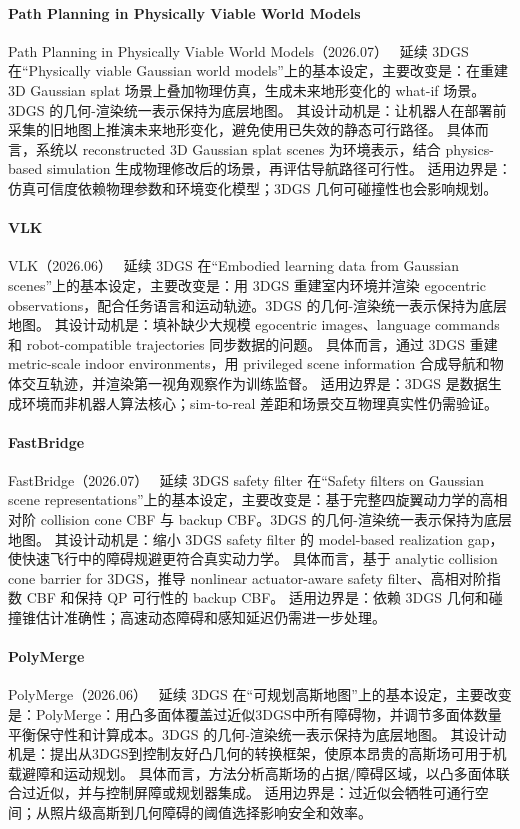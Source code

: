 \paragraph{Path Planning in Physically Viable World Models}
Path Planning in Physically Viable World Models（2026.07）~\cite{2607_00673} 延续 3DGS 在“Physically viable Gaussian world models”上的基本设定，主要改变是：在重建 3D Gaussian splat 场景上叠加物理仿真，生成未来地形变化的 what-if 场景。3DGS 的几何-渲染统一表示保持为底层地图。
其设计动机是：让机器人在部署前采集的旧地图上推演未来地形变化，避免使用已失效的静态可行路径。
具体而言，系统以 reconstructed 3D Gaussian splat scenes 为环境表示，结合 physics-based simulation 生成物理修改后的场景，再评估导航路径可行性。
适用边界是：仿真可信度依赖物理参数和环境变化模型；3DGS 几何可碰撞性也会影响规划。

\paragraph{VLK}
VLK（2026.06）~\cite{2606_30645} 延续 3DGS 在“Embodied learning data from Gaussian scenes”上的基本设定，主要改变是：用 3DGS 重建室内环境并渲染 egocentric observations，配合任务语言和运动轨迹。3DGS 的几何-渲染统一表示保持为底层地图。
其设计动机是：填补缺少大规模 egocentric images、language commands 和 robot-compatible trajectories 同步数据的问题。
具体而言，通过 3DGS 重建 metric-scale indoor environments，用 privileged scene information 合成导航和物体交互轨迹，并渲染第一视角观察作为训练监督。
适用边界是：3DGS 是数据生成环境而非机器人算法核心；sim-to-real 差距和场景交互物理真实性仍需验证。

\paragraph{FastBridge}
FastBridge（2026.07）~\cite{2607_01200} 延续 3DGS safety filter 在“Safety filters on Gaussian scene representations”上的基本设定，主要改变是：基于完整四旋翼动力学的高相对阶 collision cone CBF 与 backup CBF。3DGS 的几何-渲染统一表示保持为底层地图。
其设计动机是：缩小 3DGS safety filter 的 model-based realization gap，使快速飞行中的障碍规避更符合真实动力学。
具体而言，基于 analytic collision cone barrier for 3DGS，推导 nonlinear actuator-aware safety filter、高相对阶指数 CBF 和保持 QP 可行性的 backup CBF。
适用边界是：依赖 3DGS 几何和碰撞锥估计准确性；高速动态障碍和感知延迟仍需进一步处理。

\paragraph{PolyMerge}
PolyMerge（2026.06）~\cite{2606_16232} 延续 3DGS 在“可规划高斯地图”上的基本设定，主要改变是：PolyMerge：用凸多面体覆盖过近似3DGS中所有障碍物，并调节多面体数量平衡保守性和计算成本。3DGS 的几何-渲染统一表示保持为底层地图。
其设计动机是：提出从3DGS到控制友好凸几何的转换框架，使原本昂贵的高斯场可用于机载避障和运动规划。
具体而言，方法分析高斯场的占据/障碍区域，以凸多面体联合过近似，并与控制屏障或规划器集成。
适用边界是：过近似会牺牲可通行空间；从照片级高斯到几何障碍的阈值选择影响安全和效率。

